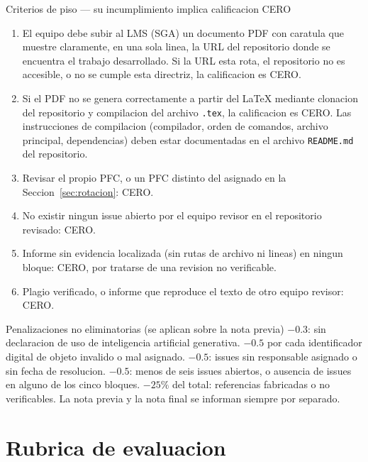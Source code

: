 \documentclass[11pt,a4paper]{article}
\begin{document}
\begin{pisoBox}{Criterios de piso --- su incumplimiento implica calificacion CERO}
    \begin{enumerate}
        \item El equipo debe subir al LMS (SGA) un documento PDF con caratula que muestre claramente, en una sola linea, la URL del repositorio donde se encuentra el trabajo desarrollado. Si la URL esta rota, el repositorio no es accesible, o no se cumple esta directriz, la calificacion es CERO.
        \item Si el PDF no se genera correctamente a partir del LaTeX mediante clonacion del repositorio y compilacion del archivo \texttt{.tex}, la calificacion es CERO. Las instrucciones de compilacion (compilador, orden de comandos, archivo principal, dependencias) deben estar documentadas en el archivo \texttt{README.md} del repositorio.
        \item Revisar el propio PFC, o un PFC distinto del asignado en la Seccion~\ref{sec:rotacion}: CERO.
        \item No existir ningun issue abierto por el equipo revisor en el repositorio revisado: CERO.
        \item Informe sin evidencia localizada (sin rutas de archivo ni lineas) en ningun bloque: CERO, por tratarse de una revision no verificable.
        \item Plagio verificado, o informe que reproduce el texto de otro equipo revisor: CERO.
    \end{enumerate}
\end{pisoBox}

\vspace{4pt}

\begin{uteqbox}{Penalizaciones no eliminatorias (se aplican sobre la nota previa)}
    $-0.3$: sin declaracion de uso de inteligencia artificial generativa. \quad
    $-0.5$ por cada identificador digital de objeto invalido o mal asignado. \quad
    $-0.5$: issues sin responsable asignado o sin fecha de resolucion. \quad
    $-0.5$: menos de seis issues abiertos, o ausencia de issues en alguno de los cinco bloques. \quad
    $-25\%$ del total: referencias fabricadas o no verificables. \quad
    La nota previa y la nota final se informan siempre por separado.
\end{uteqbox}

\clearpage
\section{Rubrica de evaluacion}
\end{document}
